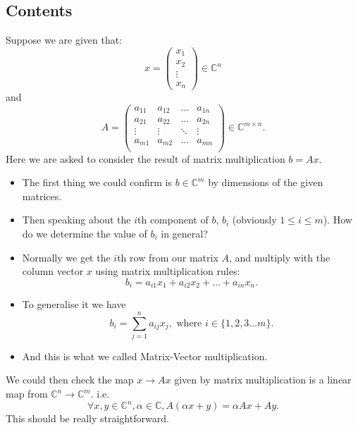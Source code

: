 \subsection*{Contents}
Suppose we are given that:
\[
x = \begin{pmatrix} x_1\\x_2\\ \vdots\\ x_n \end{pmatrix} \in \mathbb{C}^{n}
\]
and
\[
  A = \begin{pmatrix} 
  a_{11} & a_{12} & \ldots & a_{1n} \\
a_{21} & a_{22} & \ldots & a_{2n} \\ 
\vdots & \vdots & \ddots & \vdots \\
a_{m1} & a_{m2} & \ldots & a_{mn} \\  
\end{pmatrix} \in \mathbb{C}^{m \times n}
.\] 
Here we are asked to consider the result of matrix multiplication $b = Ax$.
\begin{itemize}
  \item The first thing we could confirm is $b \in \mathbb{C}^{m}$ by dimensions of the given matrices.
  \item Then speaking about the $i$th component of $b$, $b_i$ (obviously $1 \le i \le m$). How do we determine the value of $b_i$ in general? 
  \item Normally we get the $i$th row from our matrix $A$, and multiply with the column vector $x$ using matrix multiplication rules:
    \[
    b_i = a_{i1}x_1 + a_{i2}x_2 + \ldots +  a_{in}x_n
    .\]
  \item To generalise it we have
  \[
    b_i = \sum_{j = 1}^{n} a_{ij}x_j, \text{ where } i \in \{1, 2, 3 \ldots m\}
  .\]
  \item And this is what we called Matrix-Vector multiplication. \checked
\end{itemize}
We could then check the map $x \to  Ax$ given by matrix multiplication is a linear map from $\mathbb{C}^{n} \to \mathbb{C}^{m}$. i.e.
  \[
    \forall x, y \in \mathbb{C}^{n}, \alpha \in \mathbb{C}, A(\alpha x + y) = \alpha A x + A y
  .\]
This should be really straightforward.
